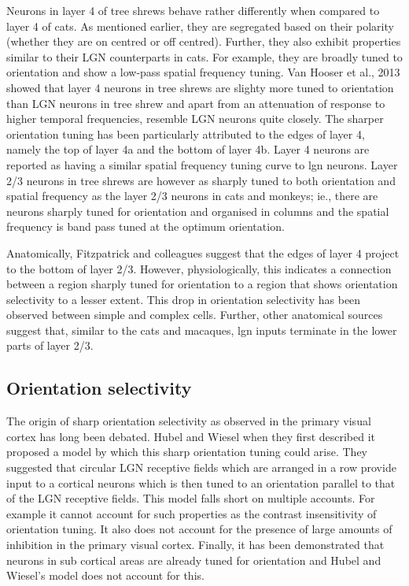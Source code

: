 				Neurons in layer 4 of tree shrews behave rather differently when compared to layer 4 of cats. As mentioned earlier, they are segregated based on their polarity (whether they are on centred or off centred). Further, they also exhibit properties similar to their LGN counterparts in cats. For example, they are broadly tuned to orientation and show a low-pass spatial frequency tuning. Van Hooser et al., 2013 showed that layer 4 neurons in tree shrews are slighty more tuned to orientation than LGN neurons in tree shrew and apart from an attenuation of response to higher temporal frequencies, resemble LGN neurons quite closely. The sharper orientation tuning has been particularly attributed to the edges of layer 4, namely the top of layer 4a and the bottom of layer 4b. Layer 4 neurons are reported as having a similar spatial frequency tuning curve to lgn neurons. Layer 2/3 neurons in tree shrews are however as sharply tuned to both orientation and spatial frequency as the layer 2/3 neurons in cats and monkeys; ie., there are neurons sharply tuned for orientation and organised in columns and the spatial frequency is band pass tuned at the optimum orientation.
	
	
				Anatomically, Fitzpatrick and colleagues suggest that the edges of layer 4 project to the bottom of layer 2/3. However, physiologically, this indicates a connection between a region sharply tuned for orientation to a region that shows orientation selectivity to a lesser extent. This drop in orientation selectivity has been observed between simple and complex cells. Further, other anatomical sources suggest that, similar to the cats and macaques, lgn inputs terminate in the lower parts of layer 2/3. 
	
	\subsection{Orientation selectivity}
	
				The origin of sharp orientation selectivity as observed in the primary visual cortex has long been debated. Hubel and Wiesel when they first described it proposed a model by which this sharp orientation tuning could arise. They suggested that circular LGN receptive fields which are arranged in a row provide input to a cortical neurons which is then tuned to an orientation parallel to that of the LGN receptive fields. This model falls short on multiple accounts. For example it cannot account for such properties as the contrast insensitivity of orientation tuning. It also does not account for the presence of large amounts of inhibition in the primary visual cortex. Finally, it has been demonstrated that neurons in sub cortical areas are already tuned for orientation and Hubel and Wiesel's model does not account for this. 
	


